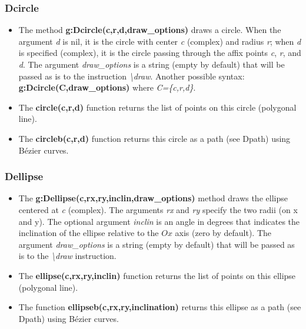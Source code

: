 \subsubsection{Dcircle}
\begin{itemize}
    \item The method \textbf{g:Dcircle(c,r,d,draw\_options)} draws a circle. When the argument \emph{d} is nil, it is the circle with center \emph{c} (complex) and radius \emph{r}; when \emph{d} is specified (complex), it is the circle passing through the affix points \emph{c}, \emph{r}, and \emph{d}. The argument \emph{draw\_options} is a string (empty by default) that will be passed as is to the instruction \emph{\textbackslash draw}. Another possible syntax: \textbf{g:Dcircle(C,draw\_options)} where \emph{C=\{c,r,d\}}.
    \item The \textbf{circle(c,r,d)} function returns the list of points on this circle (polygonal line).
    \item The \textbf{circleb(c,r,d)} function returns this circle as a path (see Dpath) using Bézier curves. \end{itemize}

\subsubsection{Dellipse}
\begin{itemize}
    \item The \textbf{g:Dellipse(c,rx,ry,inclin,draw\_options)} method draws the ellipse centered at \emph{c} (complex). The arguments \emph{rx} and \emph{ry} specify the two radii (on x and y). The optional argument \emph{inclin} is an angle in degrees that indicates the inclination of the ellipse relative to the \(Ox\) axis (zero by default). The argument \emph{draw\_options} is a string (empty by default) that will be passed as is to the \emph{\textbackslash draw} instruction.
    \item The \textbf{ellipse(c,rx,ry,inclin)} function returns the list of points on this ellipse (polygonal line).
    \item The function \textbf{ellipseb(c,rx,ry,inclination)} returns this ellipse as a path (see Dpath) using Bézier curves.
\end{itemize}

